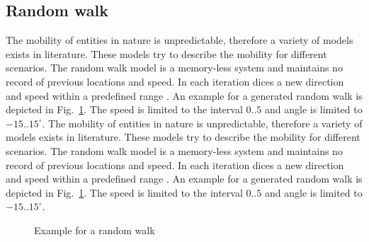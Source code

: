 \documentclass[master,english]{hgbthesis}
\begin{document}
\subsection{Random walk}
The mobility of entities in nature is unpredictable, therefore a variety of models exists in literature. These models try to describe the mobility for different scenarios. The random walk model is a memory-less system and maintains no record of previous locations and speed. In each iteration dices a new direction and speed within a predefined range \cite{Camp2002}. An example for a generated random walk is depicted in Fig.\ \ref{fig:randomwalk}. The speed is limited to the interval $0..5$ and angle is limited to $-15..15^\circ$.
The mobility of entities in nature is unpredictable, therefore a variety of models exists in literature. These models try to describe the mobility for different scenarios. The random walk model is a memory-less system and maintains no record of previous locations and speed. In each iteration dices a new direction and speed within a predefined range \cite{Camp2002}. An example for a generated random walk is depicted in Fig.\ \ref{fig:randomwalk}. The speed is limited to the interval $0..5$ and angle is limited to $-15..15^\circ$.
\begin{figure}
	\centering
	\caption{Example for a random walk}
	\label{fig:randomwalk}
\end{figure}
\end{document}
